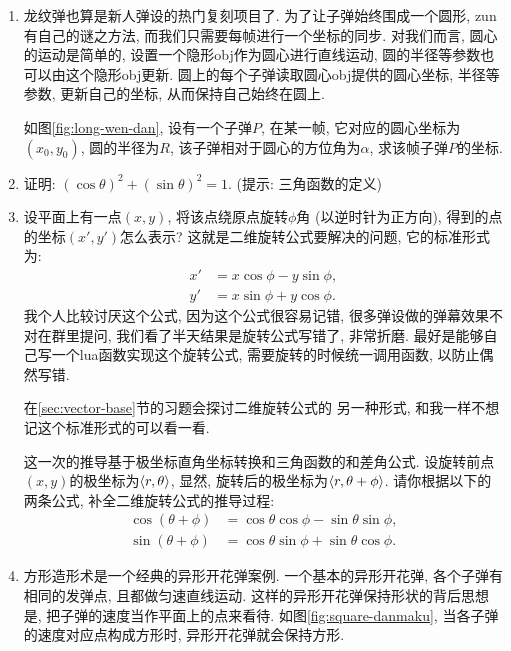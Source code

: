 \begin{enumerate}
  \item {}
        龙纹弹也算是新人弹设的热门复刻项目了.
        为了让子弹始终围成一个圆形, zun有自己的谜之方法,
        而我们只需要每帧进行一个坐标的同步.
        对我们而言, 圆心的运动是简单的,
        设置一个隐形obj作为圆心进行直线运动,
        圆的半径等参数也可以由这个隐形obj更新.
        圆上的每个子弹读取圆心obj提供的圆心坐标, 半径等参数,
        更新自己的坐标, 从而保持自己始终在圆上.

        如图\ref{fig:long-wen-dan},
        设有一个子弹$P$, 在某一帧,
        它对应的圆心坐标为$(x_0,y_0)$,
        圆的半径为$R$, 该子弹相对于圆心的方位角为$\alpha$,
        求该帧子弹$P$的坐标.

  \item 证明: $(\cos\theta)^2 + (\sin\theta)^2 = 1$.
        (提示: 三角函数的定义)

  \item {}
        设平面上有一点$(x,y)$, 将该点绕原点旋转$\phi$角
        (以逆时针为正方向), 得到的点的坐标$(x',y')$怎么表示?
        这就是二维旋转公式要解决的问题,
        它的标准形式为:
        \begin{align*}
          x' & = x \cos\phi - y \sin\phi, \\
          y' & = x \sin\phi + y \cos\phi.
        \end{align*}
        我个人比较讨厌这个公式, 因为这个公式很容易记错,
        很多弹设做的弹幕效果不对在群里提问,
        我们看了半天结果是旋转公式写错了, 非常折磨.
        最好是能够自己写一个lua函数实现这个旋转公式,
        需要旋转的时候统一调用函数, 以防止偶然写错.

        在\ref{sec:vector-base}节的习题会探讨二维旋转公式的
        另一种形式, 和我一样不想记这个标准形式的可以看一看.

        这一次的推导基于极坐标直角坐标转换和三角函数的和差角公式.
        设旋转前点$(x,y)$的极坐标为$\braket{r,\theta}$,
        显然, 旋转后的极坐标为$\braket{r,\theta+\phi}$.
        请你根据以下的两条公式, 补全二维旋转公式的推导过程:
        \begin{align*}
          \cos(\theta+\phi) & =
          \cos\theta\cos\phi - \sin\theta\sin\phi, \\
          \sin(\theta+\phi) & =
          \cos\theta\sin\phi + \sin\theta\cos\phi.
        \end{align*}

  \item {}
        方形造形术是一个经典的异形开花弹案例.
        一个基本的异形开花弹, 各个子弹有相同的发弹点, 且都做匀速直线运动.
        这样的异形开花弹保持形状的背后思想是,
        把子弹的速度当作平面上的点来看待.
        如图\ref{fig:square-danmaku},
        当各子弹的速度对应点构成方形时, 异形开花弹就会保持方形.


\end{enumerate}
